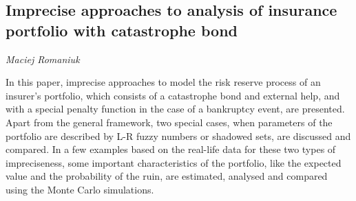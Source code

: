 \documentclass[../booklet.tex]{subfiles}
\begin{document}
\subsection[Imprecise approaches to analysis of insurance portfolio with catastrophe bond. {\it Maciej Romaniuk}]{Imprecise approaches to analysis of insurance portfolio with catastrophe bond}

\begin{center}
  {\it Maciej Romaniuk}
\end{center}



In this paper, imprecise approaches to model the risk reserve process of an insurer's portfolio, which consists of a catastrophe bond and external help, and with a special penalty function in the case of a bankruptcy event, are presented.
Apart from the general framework, two special cases, when parameters of the portfolio are described by L-R fuzzy numbers or shadowed sets, are discussed and compared.
In a few examples based on the real-life data for these two types of impreciseness, some important characteristics of the portfolio, like the expected value and the probability of the ruin, are estimated, analysed and compared using the Monte Carlo simulations.  

\end{document}
